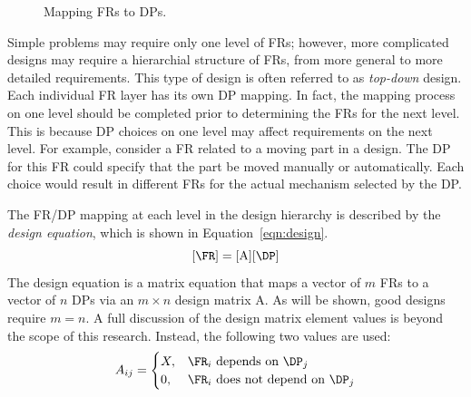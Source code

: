 \begin{figure}[H]
  \label{fig:mapping}
  \begin{center}
  \end{center}
  \caption{Mapping FRs to DPs.}
\end{figure}

Simple problems may require only one level of FRs; however, more complicated designs may require a hierarchial
structure of FRs, from more general to more detailed requirements.  This type of design is often referred to as
\emph{top-down} design.  Each individual FR layer has its own DP mapping.  In fact, the mapping process on one
level should be completed prior to determining the FRs for the next level.  This is because DP choices on one level
may affect requirements on the next level.  For example, consider a FR related to a moving part in a design.  The
DP for this FR could specify that the part be moved manually or automatically.  Each choice would result in
different FRs for the actual mechanism selected by the DP.

The FR/DP mapping at each level in the design hierarchy is described by the \emph{design equation}, which is shown
in Equation~\ref{eqn:design}.
\begin{equation}
  \label{eqn:design}
  [\FR]=[\text{A}][\DP]
\end{equation}
The design equation is a matrix equation that maps a vector of \(m\) FRs to a vector of \(n\) DPs via an \(m\times
n\) design matrix A.  As will be shown, good designs require \(m=n\).  A full discussion of the design matrix
element values is beyond the scope of this research.  Instead, the following two values are used:
\[A_{ij}=\begin{cases}
X, & \FR_i\ \text{depends on}\ \DP_j \\
0, & \FR_i\ \text{does not depend on}\ \DP_j
\end{cases}\]

